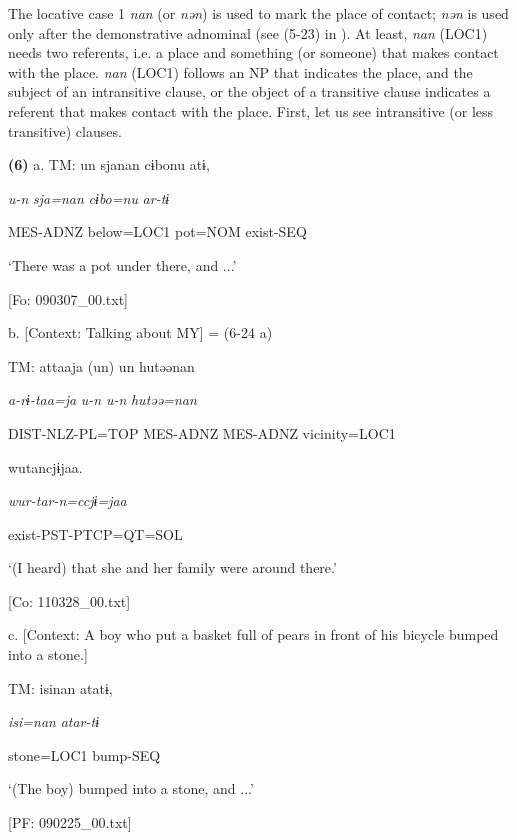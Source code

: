 The locative case 1 \textit{nan} (or \textit{nən}) is used to mark the place of contact; \textit{nən} is used only after the demonstrative adnominal (see (5-23) in ). At least, \textit{nan} (LOC1) needs two referents, i.e. a place and something (or someone) that makes contact with the place. \textit{nan} (LOC1) follows an NP that indicates the place, and the subject of an intransitive clause, or the object of a transitive clause indicates a referent that makes contact with the place. First, let us see intransitive (or less transitive) clauses.

\textbf{(6)}  a.  TM:  un  sjanan  cɨbonu  atɨ,

      \textit{u-n}  \textit{sja=nan}  \textit{cɨbo=nu}  \textit{ar-tɨ}

      MES-ADNZ  below=LOC1  pot=NOM  exist-SEQ

      ‘There was a pot under there, and ...’

      [Fo: 090307\_00.txt]

  b.  [Context: Talking about MY] = (6-24 a)

    TM:  attaaja  (un)  un  hutəənan

      \textit{a-rɨ-taa=ja}  \textit{u-n}  \textit{u-n}  \textit{hutəə=nan}

      DIST-NLZ-PL=TOP  MES-ADNZ  MES-ADNZ  vicinity=LOC1

      wutancjɨjaa.

      \textit{wur-tar-n=ccjɨ=jaa}

      exist-PST-PTCP=QT=SOL

      ‘(I heard) that she and her family were around there.’

      [Co: 110328\_00.txt]

  c.  [Context: A boy who put a basket full of pears in front of his bicycle bumped into a stone.]

    TM:  isinan  atatɨ,

      \textit{isi=nan}  \textit{atar-tɨ}

      stone=LOC1  bump-SEQ

      ‘(The boy) bumped into a stone, and ...’

      [PF: 090225\_00.txt]

